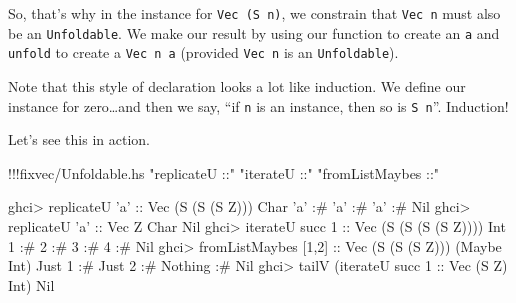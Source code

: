 \documentclass[]{article}
\newenvironment{Shaded}{}{}
\newcommand{\DataTypeTok}[1]{\textcolor[rgb]{0.56,0.13,0.00}{{#1}}}
\newcommand{\DecValTok}[1]{\textcolor[rgb]{0.25,0.63,0.44}{{#1}}}
\newcommand{\CharTok}[1]{\textcolor[rgb]{0.25,0.44,0.63}{{#1}}}
\newcommand{\StringTok}[1]{\textcolor[rgb]{0.25,0.44,0.63}{{#1}}}
\newcommand{\OtherTok}[1]{\textcolor[rgb]{0.00,0.44,0.13}{{#1}}}
\newcommand{\FunctionTok}[1]{\textcolor[rgb]{0.02,0.16,0.49}{{#1}}}
\newcommand{\NormalTok}[1]{{#1}}
\begin{document}
So, that's why in the instance for \texttt{Vec\ (S\ n)}, we constrain
that \texttt{Vec\ n} must also be an \texttt{Unfoldable}. We make our
result by using our function to create an \texttt{a} and \texttt{unfold}
to create a \texttt{Vec\ n\ a} (provided \texttt{Vec\ n} is an
\texttt{Unfoldable}).

Note that this style of declaration looks a lot like induction. We
define our instance for zero\ldots{}and then we say, ``if \texttt{n} is
an instance, then so is \texttt{S\ n}''. Induction!

Let's see this in action.

\begin{Shaded}
\begin{Highlighting}[]
\FunctionTok{!!!}\NormalTok{fixvec}\FunctionTok{/}\NormalTok{Unfoldable.hs }\StringTok{"replicateU ::"} \StringTok{"iterateU ::"} \StringTok{"fromListMaybes ::"}
\end{Highlighting}
\end{Shaded}

\begin{Shaded}
\begin{Highlighting}[]
\NormalTok{ghci}\FunctionTok{>} \NormalTok{replicateU }\CharTok{'a'}\OtherTok{       ::} \DataTypeTok{Vec} \NormalTok{(}\DataTypeTok{S} \NormalTok{(}\DataTypeTok{S} \NormalTok{(}\DataTypeTok{S} \DataTypeTok{Z}\NormalTok{))) }\DataTypeTok{Char}
\CharTok{'a'} \FunctionTok{:#} \CharTok{'a'} \FunctionTok{:#} \CharTok{'a'} \FunctionTok{:#} \DataTypeTok{Nil}
\NormalTok{ghci}\FunctionTok{>} \NormalTok{replicateU }\CharTok{'a'}\OtherTok{       ::} \DataTypeTok{Vec} \DataTypeTok{Z} \DataTypeTok{Char}
\DataTypeTok{Nil}
\NormalTok{ghci}\FunctionTok{>} \NormalTok{iterateU succ }\DecValTok{1}\OtherTok{      ::} \DataTypeTok{Vec} \NormalTok{(}\DataTypeTok{S} \NormalTok{(}\DataTypeTok{S} \NormalTok{(}\DataTypeTok{S} \NormalTok{(}\DataTypeTok{S} \DataTypeTok{Z}\NormalTok{)))) }\DataTypeTok{Int}
\DecValTok{1} \FunctionTok{:#} \DecValTok{2} \FunctionTok{:#} \DecValTok{3} \FunctionTok{:#} \DecValTok{4} \FunctionTok{:#} \DataTypeTok{Nil}
\NormalTok{ghci}\FunctionTok{>} \NormalTok{fromListMaybes [}\DecValTok{1}\NormalTok{,}\DecValTok{2}\NormalTok{]}\OtherTok{ ::} \DataTypeTok{Vec} \NormalTok{(}\DataTypeTok{S} \NormalTok{(}\DataTypeTok{S} \NormalTok{(}\DataTypeTok{S} \DataTypeTok{Z}\NormalTok{))) (}\DataTypeTok{Maybe} \DataTypeTok{Int}\NormalTok{)}
\DataTypeTok{Just} \DecValTok{1} \FunctionTok{:#} \DataTypeTok{Just} \DecValTok{2} \FunctionTok{:#} \DataTypeTok{Nothing} \FunctionTok{:#} \DataTypeTok{Nil}
\NormalTok{ghci}\FunctionTok{>} \NormalTok{tailV (iterateU succ }\DecValTok{1}\OtherTok{ ::} \DataTypeTok{Vec} \NormalTok{(}\DataTypeTok{S} \DataTypeTok{Z}\NormalTok{) }\DataTypeTok{Int}\NormalTok{)}
\DataTypeTok{Nil}
\end{Highlighting}
\end{Shaded}
\end{document}
